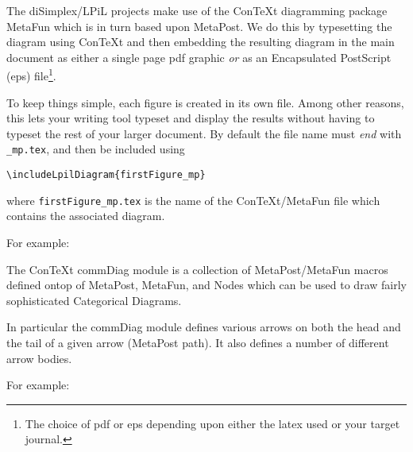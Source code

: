 

The diSimplex/LPiL projects make use of the ConTeXt diagramming package MetaFun
which is in turn based upon MetaPost. We do this by typesetting the diagram
using ConTeXt and then embedding the resulting diagram in the main document as
either a single page pdf graphic \emph{or} as an Encapsulated PostScript (eps)
file\footnote{The choice of pdf or eps depending upon either the latex
used or your target journal.}.

To keep things simple, each figure is created in its own file. Among other
reasons, this lets your writing tool typeset and display the results without
having to typeset the rest of your larger document. By default the file name
must \emph{end} with \verb|_mp.tex|, and then be included using
\begin{center}
  \verb|\includeLpilDiagram{firstFigure_mp}|
\end{center}
\noindent where \verb|firstFigure_mp.tex| is
the name of the ConTeXt/MetaFun file which contains the associated diagram.

For example:





The ConTeXt commDiag module is a collection of MetaPost/MetaFun macros defined
ontop of MetaPost, MetaFun, and Nodes which can be used to draw fairly
sophisticated Categorical Diagrams.

In particular the commDiag module defines various arrows on both the head and
the tail of a given arrow (MetaPost path). It also defines a number of different
arrow bodies.

For example:


